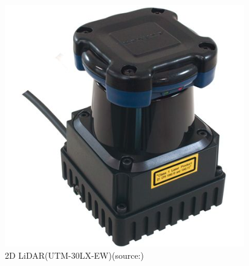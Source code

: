 \vspace{10zh}
\begin{figure}[H]
  \centering
  \includegraphics[keepaspectratio, scale=0.6]{images/png/LiDAR.png}
  \caption{2D LiDAR(UTM-30LX-EW)(source:\cite{lidar})}
  \label{Fig:4.2}
\end{figure}


